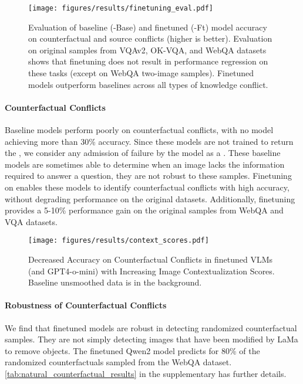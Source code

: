 \begin{figure*}
    \centering
    \vspace{-4mm}
    \texttt{[image: figures/results/finetuning\_eval.pdf]}
    \vspace{-2mm}
    \caption{Evaluation of baseline (-Base) and \segsub finetuned (-Ft) model accuracy on counterfactual and source conflicts (higher is better). Evaluation on original samples from VQAv2, OK-VQA, and WebQA datasets shows that finetuning does not result in performance regression on these tasks (except on WebQA two-image samples). Finetuned models outperform baselines across all types of knowledge conflict.}
    \vspace{-4mm}
    \label{fig:finetuning_results}
    
\end{figure*}



\vspace{-2mm}
\paragraph{Counterfactual Conflicts}
Baseline models perform poorly on counterfactual conflicts, with no model achieving more than 30\% accuracy. Since these models are not trained to return the \retlabel, we consider any admission of failure by the model as a \retlabel. These baseline models are sometimes able to determine when an image lacks the information required to answer a question, they are not robust to these samples. Finetuning on enables these models to identify counterfactual conflicts with high accuracy, without degrading performance on the original datasets. Additionally, finetuning provides a 5-10\% performance gain on the original samples from WebQA and VQA datasets.

\begin{figure}
    \centering
    \texttt{[image: figures/results/context\_scores.pdf]}
    \vspace{-3mm}
    \caption{Decreased Accuracy on Counterfactual Conflicts in finetuned VLMs (and GPT4-o-mini) with Increasing Image Contextualization Scores. Baseline unsmoothed data is in the background.}
    \label{fig:context_scores}
    \vspace{-4mm}
\end{figure}


\vspace{-2mm}
\paragraph{Robustness of Counterfactual Conflicts}
We find that finetuned models are robust in detecting randomized counterfactual samples. They are not simply detecting images that have been modified by LaMa to remove objects. The finetuned Qwen2 model predicts \retlabel for 80\% of the randomized counterfactuals sampled from the WebQA dataset. \autoref{tab:natural_counterfactual_results} in the supplementary has further details.

